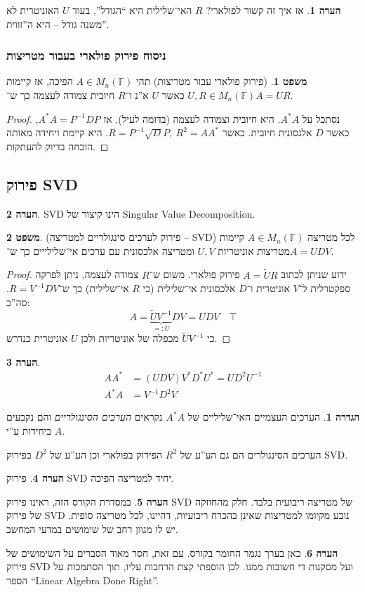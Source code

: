 \documentclass[a4paper]{article}
\newcommand\F         {\mathbb{F}}
\newcommand\tl    {\tilde}
\newcommand\op    {^{-1}}
\theoremstyle{definition}
\newtheorem{Theorem}{משפט}
\newtheorem{definition}{הגדרה}
\newtheorem{Remark}{הערה}
\newcommand\theo  [1] {\begin{Theorem}#1\end{Theorem}}
\newcommand\defi  [1] {\begin{definition}#1\end{definition}}
\newcommand\rmark [1] {\begin{Remark}#1\end{Remark}}
\begin{document}
	\rmark{אז איך זה קשור לפולארי? $R$ האי־שלילית היא ``הגודל'', בעוד $U$ האוניטרית לא משנה גודל – היא ה''זווית''. }
	
	
	\subsubsection{ניסוח פירוק פולארי בעבור מטריצות}
	\theo{(פירוק פולארי עבור מטריצות) תהי $A \in M_n(\F)$ הפיכה, אז קיימות $U, R \in M_n(\F)$ כאשר $U$ א''נ ו־$R$ חיובית צמודה לעצמה כך ש־$A = UR$. }\begin{proof}
		נסתכל על $A^*A$. היא חיובית וצמודה לעצמה (בדומה לעיל). אז $A^*A = P\op D P$, כאשר $D$ אלגסונית חיובית. כאשר $R = P\op \sqrt D P, \ R^2 = AA^*$. היא קיימת ויחידה מאותה הוכחה בדיוק להעתקות. 
	\end{proof}
	
	\subsection{פירוק SVD}
	\rmark{SVD הינו קיצור של Singular Value Decomposition. }
	\theo{(פירוק לערכים סינגולריים למטריצה – SVD) לכל מטריצה $A \in M_n(\F)$ קיימות מטריצות אוניטריות $U, V$ ומטריצה אלכסונית עם ערכים אי־שלילייים כך ש־$A = UDV$. }
	\begin{proof}
		ידוע שניתן לכתוב $A = \tl UR$ פירוק פולארי. משום ש־$R$ צמודה לעצמה, ניתן לפרקה ספקטרלית ל־$V$ אוניטרית ו־$D$ אלכסונית אי־שלילית (כי $R$ אי־שלילית) כך ש־$R = V\op DV$. סה''כ: 
		\[ A = \underbrace{\tl UV\op}_{=: U} DV = UDV \quad \top \]
		כי $\tl UV\op$ מכפלה של אוניטריות ולכן $U$ אוניטרית כנדרש. 
	\end{proof}
	
	\rmark{\begin{align*}
			AA^* &= (UDV) V^*D^*U^* = UD^2U\op \\
			A^*A &= V\op D^2 V
	\end{align*}}
	
	
	\defi{הערכים העצמיים האי־שליליים של $A^*A$ נקראים \textit{הערכים הסינגולריים} והם נקבעים ביחידות ע''י $A$. }
	הערכים הסינגולרים הם גם הע''ע של $R^2$ הפירוק בפולארי וכן הע''ע של $D^2$ בפירוק SVD. 
	
	\rmark{פירוק SVD יחיד למטריצה הפיכה. }
	\rmark{במסדרת הקורס הזה, ראינו פירוק SVD של מטריצה ריבועית בלבד. חלק מהחוזקה של פירוק SVD נובע מקיומו למטריצות שאינן בהכרח ריבועיות, דהיינו, לכל מטריצה סופית. יש לו מגוון רחב של שימושים במדעי המחשב. }
	
	\rmark{כאן בערך נגמר החומר בקורס. עם זאת, חסר מאוד הסברים על השימושים של פירוק SVD ועל מסקנות די חשובות ממנו. לכן הוספתי קצת הרחבות עליו, תוך הסתמכות על הספר ``Linear Algebra Done Right''. }
	
\end{document}
